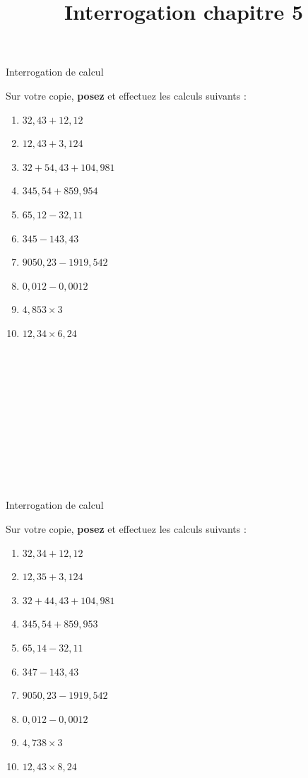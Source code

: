 \documentclass[14 pt]{extarticle}
\title{Interrogation chapitre 5}
\date{}
\theoremstyle{plain}
\begin{document}
\begin{center}{\Large Interrogation de calcul}\\ 
 \end{center}
 
 Sur votre copie, \textbf{posez} et effectuez les calculs suivants : 
 \begin{enumerate}
 \item $32, 43 + 12, 12$ %
 \item $12, 43 + 3, 124$ %
 \item $32 + 54, 43 + 104, 981$ %
 \item $ 345, 54 + 859, 954$ %
 \item $65, 12 - 32, 11$ %
 \item $ 345 - 143, 43$ %
 \item $ 9050, 23 - 1919, 542$ %
 \item $0, 012 -0, 0012$ %
 \item $4,853\times 3$ %
 \item $12,34 \times 6,24$ %
 \end{enumerate}

 \ \\ \ \\ \ \\ \ \\ \ \\ 
 \ \\ \ \\ \ \\ \ \\ \ \\ 
 
 \begin{center}{\Large Interrogation de calcul}\\ 
 \end{center}
 
 Sur votre copie, \textbf{posez} et effectuez les calculs suivants : 
 \begin{enumerate}
 \item $32, 34 + 12, 12$ %
 \item $12, 35 + 3, 124$ %
 \item $32 + 44, 43 + 104, 981$ %
 \item $ 345, 54 + 859, 953$ %
 \item $65, 14 - 32, 11$ %
 \item $ 347 - 143, 43$ %
 \item $ 9050, 23 - 1919, 542$ %
 \item $0, 012 -0, 0012$ %
 \item $4,738\times 3$ %
 \item $12,43 \times 8,24$ %
 \end{enumerate}
 	
\end{document}
